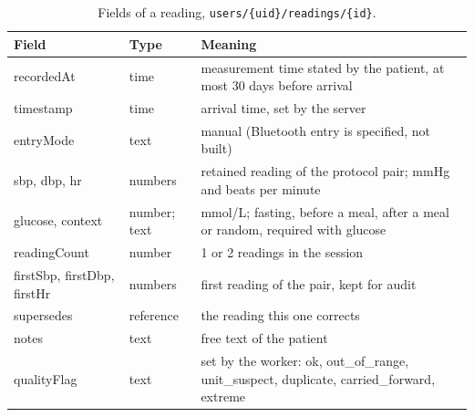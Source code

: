 \documentclass[11pt,a4paper,oneside]{report}
\begin{document}
\begin{table}[htbp]
\centering\footnotesize
\caption{Fields of a reading, \texttt{users/\{uid\}/readings/\{id\}}.}\label{tab:schema-reading}
\begin{tabularx}{\textwidth}{@{}>{\ttfamily\raggedright\arraybackslash}p{3.4cm} >{\raggedright\arraybackslash}p{2.1cm} X@{}}
\toprule
\normalfont\textbf{Field} & \textbf{Type} & \textbf{Meaning} \\
\midrule
recordedAt & time & measurement time stated by the patient, at most 30 days before arrival \\
timestamp & time & arrival time, set by the server \\
entryMode & text & manual (Bluetooth entry is specified, not built) \\
sbp, dbp, hr & numbers & retained reading of the protocol pair; mmHg and beats per minute \\
glucose, context & number; text & mmol/L; fasting, before a meal, after a meal or random, required with glucose \\
readingCount & number & 1 or 2 readings in the session \\
firstSbp, firstDbp, firstHr & numbers & first reading of the pair, kept for audit \\
supersedes & reference & the reading this one corrects \\
notes & text & free text of the patient \\
qualityFlag & text & set by the worker: ok, out\_of\_range, unit\_suspect, duplicate, carried\_forward, extreme \\
\bottomrule
\end{tabularx}
\end{table}
\end{document}
